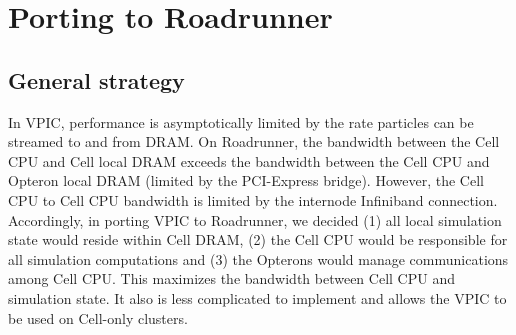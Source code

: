 \documentclass[journal,twoside]{IEEEtran}
\begin{document}

\section{Porting to Roadrunner}

\subsection{General strategy}

In VPIC, performance is asymptotically limited by the rate particles
can be streamed to and from DRAM.  On Roadrunner, the bandwidth
between the Cell CPU and Cell local DRAM exceeds the bandwidth between
the Cell CPU and Opteron local DRAM (limited by the PCI-Express
bridge).  However, the Cell CPU to Cell CPU bandwidth is limited by
the internode Infiniband connection.  Accordingly, in porting VPIC to
Roadrunner, we decided (1) all local simulation state would reside
within Cell DRAM, (2) the Cell CPU would be responsible for all
simulation computations and (3) the Opterons would manage
communications among Cell CPU.  This maximizes the bandwidth between
Cell CPU and simulation state.  It also is less complicated to
implement and allows the VPIC to be used on Cell-only clusters.




\end{document}

